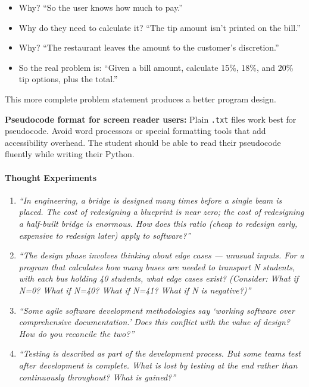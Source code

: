 \documentclass[
  justified,
  openright,
]{tufte-book}
\let\paragraph\paragraph
\let\paragraph\paragraph
\providecommand{\tightlist}{%
  \setlength{\itemsep}{0pt}\setlength{\parskip}{0pt}}
\begin{document}
\begin{itemize}
\tightlist
\item
  Why? ``So the user knows how much to pay.''
\item
  Why do they need to calculate it? ``The tip amount isn't printed on
  the bill.''
\item
  Why? ``The restaurant leaves the amount to the customer's
  discretion.''
\item
  So the real problem is: ``Given a bill amount, calculate 15\%, 18\%,
  and 20\% tip options, plus the total.''
\end{itemize}

This more complete problem statement produces a better program design.

\textbf{Pseudocode format for screen reader users:} Plain \texttt{.txt}
files work best for pseudocode. Avoid word processors or special
formatting tools that add accessibility overhead. The student should be
able to read their pseudocode fluently while writing their Python.

\paragraph{Thought Experiments}\label{thought-experiments-7}

\begin{enumerate}
\def\labelenumi{\arabic{enumi}.}
\item
  \emph{``In engineering, a bridge is designed many times before a
  single beam is placed. The cost of redesigning a blueprint is near
  zero; the cost of redesigning a half-built bridge is enormous. How
  does this ratio (cheap to redesign early, expensive to redesign later)
  apply to software?''}
\item
  \emph{``The design phase involves thinking about edge cases ---
  unusual inputs. For a program that calculates how many buses are
  needed to transport N students, with each bus holding 40 students,
  what edge cases exist? (Consider: What if N=0? What if N=40? What if
  N=41? What if N is negative?)''}
\item
  \emph{``Some agile software development methodologies say `working
  software over comprehensive documentation.' Does this conflict with
  the value of design? How do you reconcile the two?''}
\item
  \emph{``Testing is described as part of the development process. But
  some teams test after development is complete. What is lost by testing
  at the end rather than continuously throughout? What is gained?''}
\end{enumerate}
\end{document}
